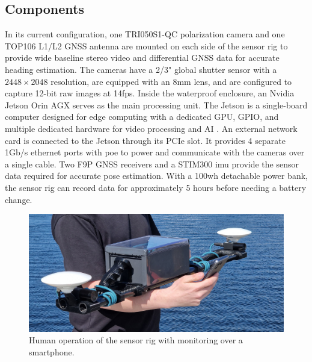 \subsection{Components}
In its current configuration, one TRI050S1-QC polarization camera and one TOP106 L1/L2 GNSS antenna are mounted on each side of the sensor rig to provide wide baseline stereo video and differential GNSS data for accurate heading estimation.
The cameras have a 2/3" global shutter sensor with a $2448\times2048$ resolution, are equipped with an 8mm lens, and are configured to capture 12-bit raw images at 14fps.
Inside the waterproof enclosure, an Nvidia Jetson Orin AGX serves as the main processing unit.
The Jetson is a single-board computer designed for edge computing with a dedicated GPU, GPIO, and multiple dedicated hardware for video processing and AI \cite{karumbunathanNVIDIAJetsonAGX2022}.
An external network card is connected to the Jetson through its PCIe slot. 
It provides 4 separate 1Gb/s ethernet ports with \gls{poe} to power and communicate with the cameras over a single cable.
Two F9P GNSS receivers and a STIM300 \gls{imu} provide the sensor data required for accurate pose estimation.
With a 100wh detachable power bank, the sensor rig can record data for approximately 5 hours before needing a battery change.

\begin{figure}[H]
    \centering
    \includegraphics[trim={0 1cm 0 1cm},clip,width=\textwidth]{figures/operation.jpg}
    \caption{Human operation of the sensor rig with monitoring over a smartphone. \label{fig:operation}}
\end{figure}

